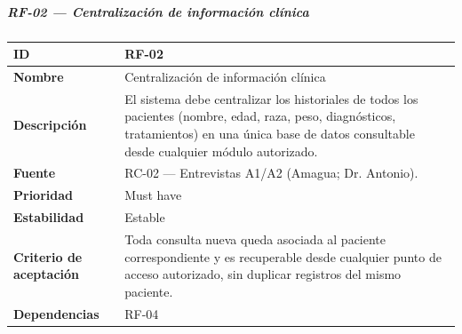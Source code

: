 \subparagraph{RF-02 --- Centralización de información
clínica}\label{rf-02-centralizaciuxf3n-de-informaciuxf3n-cluxednica}

{\def\LTcaptype{none} %
\begin{longtable}[]{@{}
  >{\raggedright\arraybackslash}p{}
  >{\raggedright\arraybackslash}p{}@{}}
\toprule\noalign{}
\begin{minipage}[b]{\linewidth}\raggedright
\textbf{ID}
\end{minipage} & \begin{minipage}[b]{\linewidth}\raggedright
RF-02
\end{minipage} \\
\midrule\noalign{}
\endhead
\bottomrule\noalign{}
\endlastfoot
\textbf{Nombre} & \begin{minipage}[t]{\linewidth}\raggedright
Centralización de información clínica
\end{minipage} \\
\textbf{Descripción} & \begin{minipage}[t]{\linewidth}\raggedright
El sistema debe centralizar los historiales de todos los pacientes
(nombre, edad, raza, peso, diagnósticos, tratamientos) en una única base de datos consultable
desde cualquier módulo autorizado.
\end{minipage} \\
\textbf{Fuente} & \begin{minipage}[t]{\linewidth}\raggedright
RC-02 --- Entrevistas A1/A2 (Amagua; Dr. Antonio).
\end{minipage} \\
\textbf{Prioridad} & \begin{minipage}[t]{\linewidth}\raggedright
Must have
\end{minipage} \\
\textbf{Estabilidad} & \begin{minipage}[t]{\linewidth}\raggedright
Estable
\end{minipage} \\
\textbf{Criterio de aceptación} &
\begin{minipage}[t]{\linewidth}\raggedright
Toda consulta nueva queda asociada al paciente correspondiente y es
recuperable desde cualquier punto de acceso autorizado, sin duplicar
registros del mismo paciente.
\end{minipage} \\
\textbf{Dependencias} & \begin{minipage}[t]{\linewidth}\raggedright
RF-04
\end{minipage} \\
\end{longtable}
}

